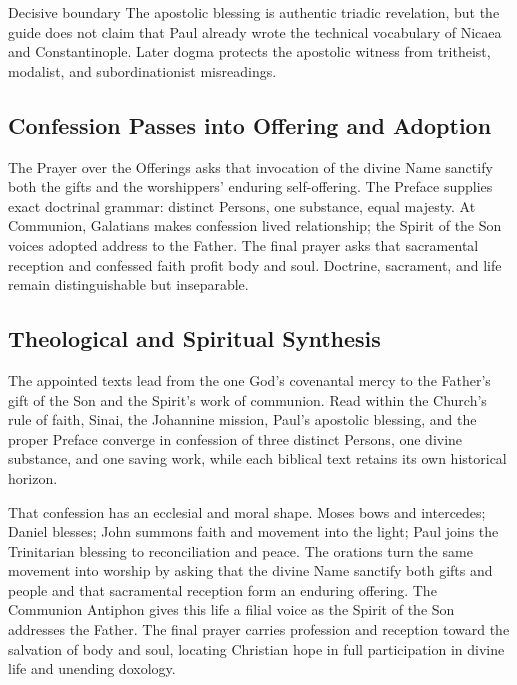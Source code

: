 \begin{deepstudy}
\begin{studybox}{Decisive boundary}
The apostolic blessing is authentic triadic revelation, but the guide does not claim that Paul already wrote the technical vocabulary of Nicaea and Constantinople. Later dogma protects the apostolic witness from tritheist, modalist, and subordinationist misreadings.
\end{studybox}

\subsection*{Confession Passes into Offering and Adoption\enspace{}}

The Prayer over the Offerings asks that invocation of the divine Name sanctify both the gifts and the worshippers' enduring self-offering. The Preface supplies exact doctrinal grammar: distinct Persons, one substance, equal majesty. At Communion, Galatians makes confession lived relationship; the Spirit of the Son voices adopted address to the Father. The final prayer asks that sacramental reception and confessed faith profit body and soul. Doctrine, sacrament, and life remain distinguishable but inseparable.

\clearpage
\subsection*{Theological and Spiritual Synthesis}

The appointed texts lead from the one God's covenantal mercy to the Father's gift of the Son and the Spirit's work of communion. Read within the Church's rule of faith, Sinai, the Johannine mission, Paul's apostolic blessing, and the proper Preface converge in confession of three distinct Persons, one divine substance, and one saving work, while each biblical text retains its own historical horizon.

That confession has an ecclesial and moral shape. Moses bows and intercedes; Daniel blesses; John summons faith and movement into the light; Paul joins the Trinitarian blessing to reconciliation and peace. The orations turn the same movement into worship by asking that the divine Name sanctify both gifts and people and that sacramental reception form an enduring offering.
The Communion Antiphon gives this life a filial voice as the Spirit of the Son addresses the Father. The final prayer carries profession and reception toward the salvation of body and soul, locating Christian hope in full participation in divine life and unending doxology.


\end{deepstudy}
